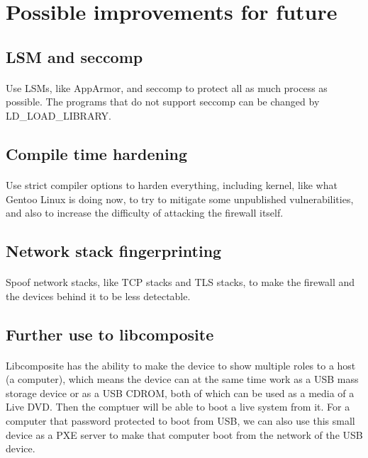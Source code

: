 \documentclass[mscthesis]{usiinfthesis}
\begin{document}
\section{Possible improvements for future}
\subsection{LSM and seccomp}
\paragraph{}
Use LSMs, like AppArmor, and seccomp to protect all as much process as possible. The programs that do not support seccomp can be changed by LD\_LOAD\_LIBRARY.

\subsection{Compile time hardening}
\paragraph{}
Use strict compiler options to harden everything, including kernel, like what Gentoo Linux is doing now, to try to mitigate some unpublished vulnerabilities, and also to increase the difficulty of attacking the firewall itself.

\subsection{Network stack fingerprinting}
\paragraph{}
Spoof network stacks, like TCP stacks and TLS stacks, to make the firewall and the devices behind it to be less detectable.

\subsection{Further use to libcomposite}
\paragraph{}
Libcomposite has the ability to make the device to show multiple roles to a host (a computer), which means the device can at the same time work as a USB mass storage device or as a USB CDROM, both of which can be used as a media of a Live DVD. Then the comptuer will be able to boot a live system from it. For a computer that password protected to boot from USB, we can also use this small device as a PXE server to make that computer boot from the network of the USB device.
\end{document}
